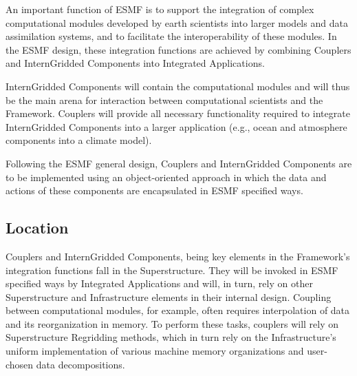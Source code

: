 




An important function of ESMF is to support the integration of
complex computational modules developed by earth scientists into
larger models and data assimilation systems, and to facilitate
the interoperability of these modules. 
In the ESMF design, these integration functions 
are achieved by combining Couplers
and InternGridded Components into Integrated Applications.

InternGridded Components will contain the 
computational modules and will thus be the main arena for interaction
between computational scientists and the Framework.  Couplers will
provide all necessary functionality required to integrate InternGridded Components
into a larger application (e.g., ocean and atmosphere components into
a climate model).

Following the ESMF general design, Couplers and InternGridded Components
are to be implemented using an object-oriented approach  
in which the data and actions of these components are encapsulated in 
ESMF specified ways.

\subsection{Location}

Couplers and InternGridded Components, being key elements in the
Framework's integration functions fall in the Superstructure.
They will be invoked in ESMF specified ways by Integrated Applications 
and will, in turn, rely on other Superstructure and Infrastructure
elements in their internal design.  Coupling between computational
modules, for example, often requires interpolation of data and
its reorganization in memory. To perform these tasks, couplers will
rely on Superstructure Regridding methods, which in turn rely on the 
Infrastructure's uniform  implementation of various machine memory
organizations and user-chosen data decompositions.





